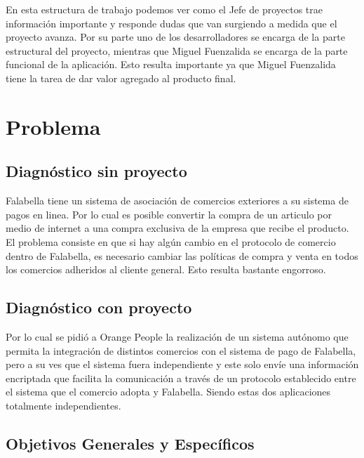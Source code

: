 \documentclass[a4paper,12pt,openany,oneside]{book}
\begin{document}
En esta estructura de trabajo podemos ver como el Jefe de proyectos trae información importante y responde dudas que van surgiendo a medida que el proyecto avanza. Por su parte uno de los desarrolladores se encarga de la parte estructural del proyecto, mientras que Miguel Fuenzalida se encarga de la parte funcional de la aplicación. Esto resulta importante ya que Miguel Fuenzalida tiene la tarea de dar valor agregado al producto final.
\chapter{Problema}
\thispagestyle{empty}
\section{Diagnóstico sin proyecto}
Falabella tiene un sistema de asociación de comercios exteriores a su sistema de pagos en linea. Por lo cual es posible convertir la compra de un articulo por medio de internet a una compra exclusiva de la empresa que recibe el producto. El problema consiste en que si hay algún cambio en el protocolo de comercio dentro de Falabella, es necesario cambiar las políticas de compra y venta en todos los comercios adheridos al cliente general. Esto resulta bastante engorroso. 
\section{Diagnóstico con proyecto}
Por lo cual se pidió a Orange People la realización de un sistema autónomo que permita la integración de distintos comercios con el sistema de pago de Falabella, pero a su ves que el sistema fuera independiente y este solo envíe una información encriptada que facilita la comunicación a través de un protocolo establecido entre el sistema que el comercio adopta y Falabella. Siendo estas dos aplicaciones totalmente independientes.
\section{Objetivos Generales y Específicos}
\end{document}

